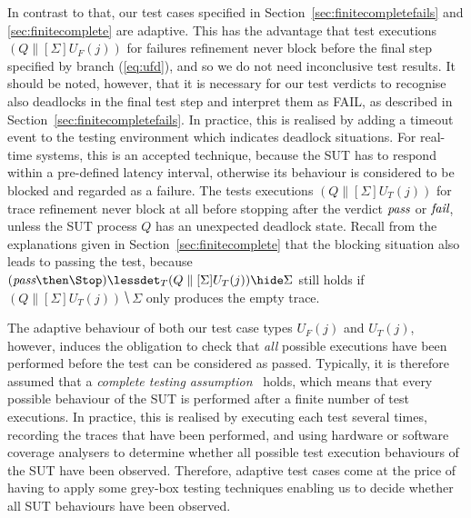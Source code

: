 In 
contrast to that, our test cases specified in
Section~\ref{sec:finitecompletefails} and \ref{sec:finitecomplete} are
adaptive. This has the advantage that test executions $(Q\parallel[\Sigma]
U_F(j))$ for failures refinement never block before the final step specified
by branch (\ref{eq:ufd}), and so we do not need inconclusive test results.
It should be noted, however, that it is
necessary for our test verdicts to recognise also deadlocks in the final test
step and interpret them as FAIL, as described in
Section~\ref{sec:finitecompletefails}. In practice, this is realised by
adding a timeout event to the testing environment which indicates deadlock
situations. For real-time systems, this is an accepted technique, because the
SUT has to respond within a pre-defined latency interval, otherwise its
behaviour is considered to be blocked and regarded as a failure.
The tests executions $(Q\parallel[\Sigma] U_T(j))$ 
for trace refinement never
block at all before stopping after the verdict ${\text{\it pass}}$ or ${\text{\it fail}}$, unless the
SUT process $Q$ has an unexpected deadlock state. 
Recall from the explanations given in Section~\ref{sec:finitecomplete} that the 
blocking situation also leads to passing the test, because 
$(\epass\then \Stop)\lessdet_T (Q\parallel[\Sigma] U_T(j))\hide\Sigma$ still holds
if $(Q\parallel[\Sigma] U_T(j))\hide\Sigma$ only produces the empty trace.

The adaptive behaviour of both our test case types $U_F(j)$ and $U_T(j)$,
however, induces the obligation to check that {\it all}
possible executions have been
performed before the test can be considered as passed. Typically, it is
therefore assumed that a \emph{complete testing
assumption}~\cite{hierons_testing_2004}  holds, which means that every possible
behaviour of the SUT is performed after a finite number of test executions.
In practice, this is realised by executing each test several times, recording
the traces that have been performed, and using hardware or software coverage
analysers to determine whether all possible test execution behaviours of the
SUT have been observed. Therefore, adaptive test cases come at the price of
having to apply some grey-box testing techniques enabling us to decide
whether all SUT behaviours have been observed.

